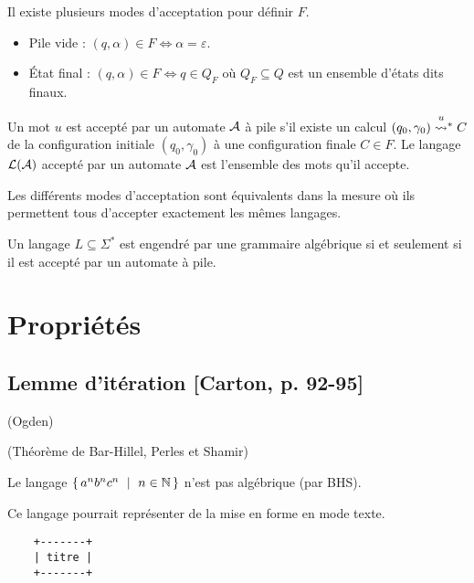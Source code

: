 \documentclass[../../agregation.tex]{subfiles}
\begin{document}
\begin{defn}
	Il existe plusieurs modes d'acceptation pour définir $F$.
	\begin{itemize}
		\item Pile vide : $(q,\alpha)\in F \iff \alpha = \varepsilon$.
		\item État final : $(q,\alpha)\in F \iff q\in Q_F$ où $Q_F\subseteq Q$ est un ensemble d'états dits finaux.
	\end{itemize}
\end{defn}

\begin{defn}
	Un mot $u$ est accepté par un automate $\mathcal{A}$ à pile s'il existe un calcul $(q_0,\gamma_0)\transitionn{u}{*}C$ de la configuration initiale $(q_0,\gamma_0)$ à une configuration finale $C\in F$. Le langage $\mathcal{L}(\mathcal{A})$ accepté par un automate $\mathcal{A}$ est l'ensemble des mots qu'il accepte.
\end{defn}

\begin{prop}
	Les différents modes d'acceptation sont équivalents dans la mesure où ils permettent tous d'accepter exactement les mêmes langages.	
\end{prop}

\begin{thm}
	Un langage $L\subseteq\Sigma^*$ est engendré par une grammaire algébrique si et seulement si il est accepté par un automate à pile.	
\end{thm}

















\section{Propriétés}


\subsection{Lemme d'itération {[}Carton, p. 92-95{]}}
\begin{lem}
	(Ogden)\end{lem}
\begin{cor}
	(Théorème de Bar-Hillel, Perles et Shamir)\end{cor}
\begin{claim}
	Le langage $\set{a^{n}b^{n}c^{n}\ |\ n\in\N}$ n'est pas algébrique
	(par BHS).\end{claim}
\begin{example}
	Ce langage pourrait représenter de la mise en forme en mode texte.
	
	\begin{lstlisting}
	+-------+
	| titre |
	+-------+
	\end{lstlisting}
	
\end{example}
\end{document}
